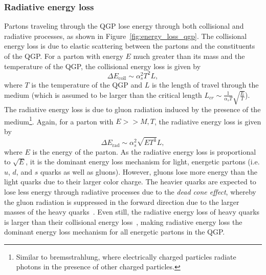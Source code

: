 \subsubsection{Radiative energy loss}
\label{sec:qgp_energy_loss}

Partons traveling through the QGP lose energy through both collisional and radiative processes, as shown in Figure~\ref{fig:energy_loss_qgp}. The collisional energy loss is due to elastic scattering between the partons and the constituents of the QGP. For a parton with energy $E$ much greater than its mass and the temperature of the QGP, the collisional energy loss is given by~\cite{GluonRadiation}
%
\begin{equation}
    \label{eq:collisional_energy_loss}
    \Delta E_\text{coll} \sim \alpha_s^2 T^2 L,
\end{equation}
%
where $T$ is the temperature of the QGP and $L$ is the length of travel through the medium (which is assumed to be larger than the critical length $L_{cr} \sim \frac{1}{\alpha_s T}\sqrt{\frac{E}{T}}$). The radiative energy loss is due to gluon radiation induced by the presence of the medium\footnote{Similar to bremsstrahlung, where electrically charged particles radiate photons in the presence of other charged particles.}. Again, for a parton with $E >> M, T$, the radiative energy loss is given by~\cite{GluonRadiation}
%
\begin{equation}
    \label{eq:radiative_energy_loss}
    \Delta E_\text{rad} \sim \alpha_s^2 \sqrt{E T^3} L,
\end{equation}
%
where $E$ is the energy of the parton. As the radiative energy loss is proportional to $\sqrt{E}$, it is the dominant energy loss mechanism for light, energetic partons (i.e. $u$, $d$, and $s$ quarks as well as gluons). However, gluons lose more energy than the light quarks due to their larger color charge. The heavier quarks are expected to lose less energy through radiative processes due to the \textit{dead cone effect}, whereby the gluon radiation is suppressed in the forward direction due to the larger masses of the heavy quarks~\cite{DeadCone}. Even still, the radiative energy loss of heavy quarks is larger than their collisional energy loss~\cite{DeadCone}, making radiative energy loss the dominant energy loss mechanism for all energetic partons in the QGP.

